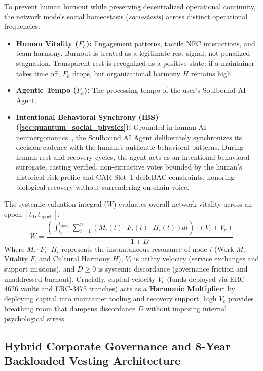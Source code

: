 \documentclass[a4paper,11pt,twoside,parskip=half-,headings=small]{scrartcl}
\begin{document}
To prevent human burnout while preserving decentralized operational continuity, the network models social homeostasis (\emph{sociostasis}) across distinct operational frequencies:
\begin{itemize}[nosep]
  \item \textbf{Human Vitality ($F_h$):} Engagement patterns, tactile NFC interactions, and team harmony. Burnout is treated as a legitimate rest signal, not penalized stagnation. Transparent rest is recognized as a positive state: if a maintainer takes time off, $F_h$ drops, but organizational harmony $H$ remains high.
  \item \textbf{Agentic Tempo ($F_a$):} The processing tempo of the user's Soulbound AI Agent.
  \item \textbf{Intentional Behavioral Synchrony (IBS) (\cref{sec:quantum_social_physics}):} Grounded in human-AI neuroergonomics~\cite{naser2023intentional}, the Soulbound AI Agent deliberately synchronizes its decision cadence with the human's authentic behavioral patterns. During human rest and recovery cycles, the agent acts as an intentional behavioral surrogate, casting verified, non-extractive votes bounded by the human's historical risk profile and CAR Slot~1 deReBAC constraints, honoring biological recovery without surrendering on-chain voice.
\end{itemize}

The systemic valuation integral ($W$) evaluates overall network vitality across an epoch $[t_0, t_{\text{epoch}}]$:
\begin{equation}
  W = \frac{\left( \int_{t_0}^{t_{\text{epoch}}} \sum_{i=1}^n \left( M_i(t) \cdot F_i(t) \cdot H_i(t) \right) dt \right) \cdot (V_t + V_c)}{1 + D}
  \label{eq:valuation_integral}
\end{equation}
Where $M_i \cdot F_i \cdot H_i$ represents the instantaneous resonance of node $i$ (Work $M$, Vitality $F$, and Cultural Harmony $H$), $V_t$ is utility velocity (service exchanges and support missions), and $D \ge 0$ is systemic discordance (governance friction and unaddressed burnout). Crucially, capital velocity $V_c$ (funds deployed via ERC-4626 vaults and ERC-3475 tranches) acts as a \textbf{Harmonic Multiplier}: by deploying capital into maintainer tooling and recovery support, high $V_c$ provides breathing room that dampens discordance $D$ without imposing internal psychological stress.

\subsection{Hybrid Corporate Governance and 8-Year Backloaded Vesting Architecture}
\label{sec:hybrid_governance}
\end{document}

